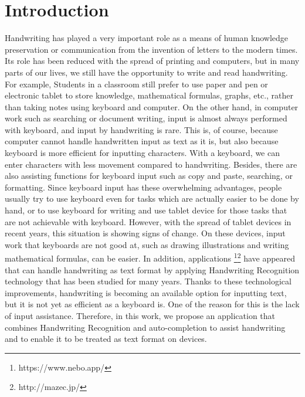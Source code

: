 \section{Introduction}

Handwriting has played a very important role as a means of human knowledge preservation
or communication from the invention of letters to the modern times.
Its role has been reduced with the spread of printing and computers,
but in many parts of our lives, we still have the opportunity to write and read handwriting.
For example, Students in a classroom still prefer to use paper and pen or electronic tablet
to store knowledge, mathematical formulas, graphs, etc.,
rather than taking notes using keyboard and computer.
On the other hand, in computer work such as searching or document writing,
input is almost always performed with keyboard, and input by handwriting is rare.
This is, of course, because computer cannot handle handwritten input as text as it is,
but also because keyboard is more efficient for inputting characters.
With a keyboard, we can enter characters with less movement compared to handwriting.
Besides, there are also assisting functions for keyboard input such as copy and paste,
searching, or formatting. Since keyboard input has these overwhelming advantages,
people usually try to use keyboard even for tasks which are actually easier to be done by hand,
or to use keyboard for writing and use tablet device for those tasks that are not achievable with keyboard.
However, with the spread of tablet devices in recent years, this situation is showing signs of change.
On these devices, input work that keyboards are not good at, such as drawing illustrations and
writing mathematical formulas, can be easier. In addition, applications
\footnote{https://www.nebo.app/}\footnote{http://mazec.jp/} have appeared that can handle handwriting
as text format by applying Handwriting Recognition technology that has been studied for many years.
Thanks to these technological improvements, handwriting is becoming an available option for inputting text,
but it is not yet as efficient as a keyboard is. One of the reason for this is the lack of input assistance.
Therefore, in this work, we propose an application that combines Handwriting Recognition and auto-completion
to assist handwriting and to enable it to be treated as text format on devices.

